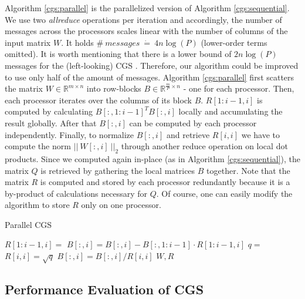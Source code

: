 \documentclass{article}
\begin{document}
Algorithm \ref{cgs:parallel} is the parallelized version of Algorithm
\ref{cgs:sequential}. We use two \textit{allreduce} operations per iteration and
accordingly, the number of messages across the processors scales linear with the
number of columns of the input matrix $W$. It holds $\# \ \textit{messages} \
\dot{=} \ 4n \log(P)$ (lower-order terms omitted). It is worth mentioning that
there is a lower bound of $2n \log(P)$ messages for the (left-looking) CGS
\cite{Grigori:2008}. Therefore, our algorithm could be improved to use only half
of the amount of messages. Algorithm \ref{cgs:parallel} first scatters the
matrix $W \in \mathbb{R}^{m \times n}$ into row-blocks $B \in
\mathbb{R}^{\frac{m}{P} \times n}$ - one for each processor. Then, each
processor iterates over the columns of its block $B$. $R[1:i-1,i]$ is computed
by calculating $B[:, 1:i-1]^T B[:, i]$ locally and accumulating the result
globally. After that $B[:,i]$ can be computed by each processor independently.
Finally, to normalize $B[:, i]$ and retrieve $R[i,i]$ we have to compute the
norm $|| \ W[:, i] \ ||_2$ through another reduce operation on local dot
products. Since we computed again in-place (as in Algorithm
\ref{cgs:sequential}), the matrix $Q$ is retrieved by gathering the local
matrices $B$ together. Note that the matrix $R$ is computed and stored by each
processor redundantly because it is a by-product of calculations necessary for
$Q$. Of course, one can easily modify the algorithm to store $R$ only on one
processor.

\begin{algorithm}[t]
    \caption{Parallel CGS} \label{cgs:parallel}
    \begin{algorithmic}[1]
        \State {}
                \State $R[1:i-1,i] =$ 
                \State $B[:, i] = B[:, i] - B[:, 1:i-1] \cdot R[1:i-1,i]$
            \EndIf
            \State $q =$ 
            \State $R[i,i] = \sqrt{q}$
            \State $B[:, i] = B[:, i] / R[i,i]$
        \EndFor
        \State {}
        \State \Return $W, R$
    \end{algorithmic}
\end{algorithm}

\subsection{Performance Evaluation of CGS}
\end{document}
